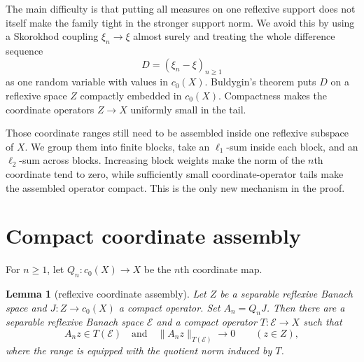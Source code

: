 \documentclass[11pt]{article}
\newtheorem{lemma}{Lemma}
\newcommand{\cnull}{c_0(X)}
\begin{document}
The main difficulty is that putting all measures on one reflexive support
does not itself make the family tight in the stronger support norm.  We avoid
this by using a Skorokhod coupling $\xi_n\to\xi$ almost surely and treating the
whole difference sequence
\[
   D=(\xi_n-\xi)_{n\geq1}
\]
as one random variable with values in $\cnull$.  Buldygin's theorem puts $D$
on a reflexive space $Z$ compactly embedded in $\cnull$.  Compactness makes
the coordinate operators $Z\to X$ uniformly small in the tail.

Those coordinate ranges still need to be assembled inside one reflexive
subspace of $X$.  We group them into finite blocks, take an $\ell_1$-sum
inside each block, and an $\ell_2$-sum across blocks.  Increasing block
weights make the norm of the $n$th coordinate tend to zero, while sufficiently
small coordinate-operator tails make the assembled operator compact.  This
is the only new mechanism in the proof.

\section{Compact coordinate assembly}

For $n\geq1$, let $Q_n:\cnull\to X$ be the $n$th coordinate map.

\begin{lemma}[reflexive coordinate assembly]\label{lem:assembly}
Let $Z$ be a separable reflexive Banach space and
$J:Z\to\cnull$ a compact operator.  Set $A_n=Q_nJ$.  Then there are a
separable reflexive Banach space $\mathcal E$ and a compact operator
$T:\mathcal E\to X$ such that
\[
  A_nz\in T(\mathcal E)
  \quad\text{and}\quad
  \|A_nz\|_{T(\mathcal E)}\longrightarrow0
  \qquad(z\in Z),
\]
where the range is equipped with the quotient norm induced by $T$.
\end{lemma}
\end{document}
